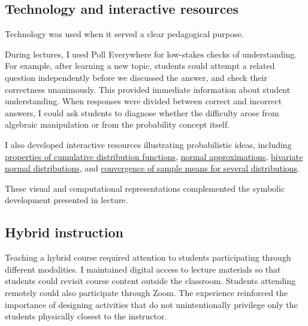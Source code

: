 \documentclass[11pt]{article}
\begin{document}
\subsection{Technology and interactive resources}

Technology was used when it served a clear pedagogical
purpose.

During lectures,
I used Poll Everywhere for low-stakes checks of understanding.
For example,
after learning a new topic,
students could attempt a related question independently before
we discussed the answer, and check their correctness unanimously. This provided immediate information about student
understanding.
When responses were divided between correct and incorrect
answers,
I could ask students to diagnose whether the difficulty arose
from algebraic manipulation or from the probability concept
itself.

I also developed  interactive resources illustrating
probabilistic ideas,
including
\href{https://armanjg.github.io/MATH-394-Probability-1-v2/Figures/pdfpmf.html}
{properties of cumulative distribution functions},
\href{https://armanjg.github.io/MATH-394-Probability-1-v2/Figures/normal-binomial-interactive.html}
{normal approximations},
\href{https://armanjg.github.io/MATH-394-Probability-1-v2/Figures/bivariate.html}
{bivariate normal distributions},
and
\href{https://armanjg.github.io/MATH-394-Probability-1-v2/Figures/normal_sample_mean_convergence.html}
{convergence of sample means for several distributions}.

These visual and computational representations complemented
the symbolic development presented in lecture.

\subsection{Hybrid instruction}

Teaching a hybrid course required attention to students
participating through different modalities. I maintained digital access to lecture materials so that students could revisit course
content outside the classroom.
Students attending remotely could also participate through
 Zoom. The experience reinforced the importance of designing
activities that do not unintentionally privilege only the
students physically closest to the instructor.

\end{document}
